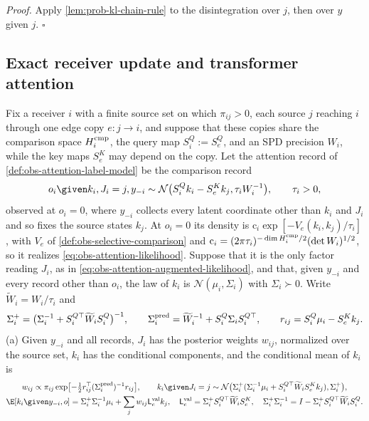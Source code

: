 \noindent\emph{Proof.}
Apply \cref{lem:prob-kl-chain-rule} to the disintegration over \(j\), then over
\(y\) given \(j\). \(\square\)

\subsection{Exact receiver update and transformer attention}
\label{sec:selective-transformer}

Fix a receiver \(i\) with a finite source set on which \(\pi_{ij}>0\), each
source \(j\) reaching \(i\) through one edge copy \(e:j\to i\), and suppose
that these copies share the comparison space \(H_i^{\rm cmp}\), the query map
\(S^Q_i:=S^Q_e\), and an SPD precision \(W_i\), while the key maps \(S^K_e\) may
depend on the copy. Let the attention record of
\cref{def:obs-attention-label-model} be the comparison record
\begin{equation}
o_i\given k_i,J_i=j,y_{-i}\sim
\mathcal N\bigl(S^Q_ik_i-S^K_ek_j,\tau_iW_i^{-1}\bigr),
\qquad\tau_i>0,
\label{eq:obs-selective-attention-record}
\end{equation}
observed at \(o_i=0\), where \(y_{-i}\) collects every latent coordinate other
than \(k_i\) and \(J_i\) and so fixes the source states \(k_j\). At \(o_i=0\)
its density is \(\mathrm c_i\exp[-V_e(k_i,k_j)/\tau_i]\), with \(V_e\) of
\cref{def:obs-selective-comparison} and
\(\mathrm c_i=(2\pi\tau_i)^{-\dim H_i^{\rm cmp}/2}(\det W_i)^{1/2}\), so it
realizes \eqref{eq:obs-attention-likelihood}. Suppose that it is the only
factor reading \(J_i\), as in \eqref{eq:obs-attention-augmented-likelihood},
and that, given \(y_{-i}\) and every record other than \(o_i\), the law of
\(k_i\) is \(\mathcal N(\mu_i,\Sigma_i)\) with \(\Sigma_i\succ0\). Write
\(\widetilde W_i=W_i/\tau_i\) and
\begin{equation}
\Sigma_i^+=\bigl(\Sigma_i^{-1}+S_i^{Q\top}\widetilde W_iS^Q_i\bigr)^{-1},
\qquad
\Sigma_i^{\rm pred}=\widetilde W_i^{-1}+S^Q_i\Sigma_iS_i^{Q\top},
\qquad
r_{ij}=S^Q_i\mu_i-S^K_ek_j.
\label{eq:obs-selective-receiver-covariances}
\end{equation}
(a) Given \(y_{-i}\) and all records, \(J_i\) has the posterior weights
\(w_{ij}\), normalized over the source set, \(k_i\) has the conditional
components, and the conditional mean of \(k_i\) is
\begin{gather}
w_{ij}\propto\pi_{ij}\exp\bigl[-\tfrac12r_{ij}^\top(\Sigma_i^{\rm pred})^{-1}r_{ij}\bigr],
\qquad
k_i\given J_i=j\sim\mathcal N\bigl(\Sigma_i^+(\Sigma_i^{-1}\mu_i
+S_i^{Q\top}\widetilde W_iS^K_ek_j),\Sigma_i^+\bigr),
\label{eq:obs-selective-receiver-posterior}\\
\E[k_i\given y_{-i},o]=\Sigma_i^+\Sigma_i^{-1}\mu_i+\sum_jw_{ij}\mathsf L_e^{\rm val}k_j,
\quad
\mathsf L_e^{\rm val}=\Sigma_i^+S_i^{Q\top}\widetilde W_iS^K_e,
\quad
\Sigma_i^+\Sigma_i^{-1}=I-\Sigma_i^+S_i^{Q\top}\widetilde W_iS^Q_i.
\label{eq:obs-selective-receiver-update}
\end{gather}
